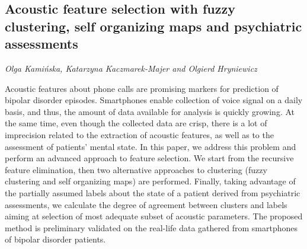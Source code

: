 \documentclass[../booklet.tex]{subfiles}
\begin{document}
\subsection[Acoustic feature selection with fuzzy clustering, self organizing maps and psychiatric assessments. {\it Olga Kamińska, Katarzyna Kaczmarek-Majer and Olgierd Hryniewicz}]{Acoustic feature selection with fuzzy clustering, self organizing maps and psychiatric assessments}
  

\begin{center}
  {\it Olga Kamińska, Katarzyna Kaczmarek-Majer and Olgierd Hryniewicz}
\end{center}

\vskip 0.8cm




Acoustic features about phone calls are promising markers for prediction of bipolar disorder episodes. Smartphones enable collection of voice signal on a daily basis, and thus, the amount of data available for analysis is quickly growing. At the same time, even though the collected data are crisp, there is a lot of imprecision related to the extraction of acoustic features, as well as to the assessment of patients' mental state. In this paper, we address this problem and perform an advanced approach to feature selection. We start from the recursive feature elimination, then two alternative approaches to clustering (fuzzy clustering and self organizing maps) are performed.
Finally, taking advantage of the partially assumed labels about the state of a patient derived from psychiatric assessments, we calculate the degree of agreement between clusters and labels aiming at selection of most adequate subset of acoustic parameters. The proposed method is preliminary validated on the real-life data gathered from smartphones of bipolar disorder patients.

\end{document}
